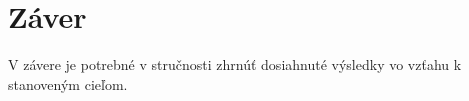 \chapter{Záver}
V závere je potrebné v stručnosti zhrnúť dosiahnuté výsledky vo vzťahu k stanoveným cieľom.  
